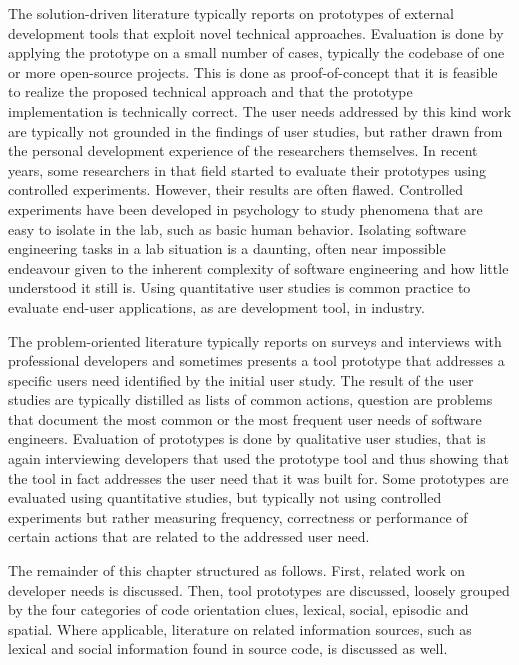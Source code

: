 The solution-driven literature typically reports on prototypes of external development tools that exploit novel technical approaches. Evaluation is done by applying the prototype on a small number of cases, typically the codebase of one or more open-source projects. This is done as proof-of-concept that it is feasible to realize the proposed technical approach and that the prototype implementation is technically correct. The user needs addressed by this kind work are typically not grounded in the findings of user studies, but rather drawn from the personal development experience of the researchers themselves. In recent years, some researchers in that field started to evaluate their prototypes using controlled experiments. However, their results are often flawed. Controlled experiments have been developed in psychology to study phenomena that are easy to isolate in the lab, such as basic human behavior. Isolating software engineering tasks in a lab situation is a daunting, often near impossible endeavour given to the inherent complexity of software engineering and how little understood it still is. Using quantitative user studies is common practice to evaluate end-user applications, as are development tool, in industry.

The problem-oriented literature typically reports on surveys and interviews with professional developers and sometimes presents a tool prototype that addresses a specific users need identified by the initial user study. The result of the user studies are typically distilled as lists of common actions, question are problems that document the most common or the most frequent user needs of software engineers. Evaluation of prototypes is done by qualitative user studies, that is again interviewing developers that used the prototype tool and thus showing that the tool in fact addresses the user need that it was built for. Some prototypes are evaluated using quantitative studies, but typically not using controlled experiments but rather measuring frequency, correctness or performance of certain actions that are related to the addressed user need.

\asteriskasteriskasterisk

The remainder of this chapter structured as follows. First, related work on developer needs is discussed. Then, tool prototypes are discussed, loosely grouped by the four categories of code orientation clues, \ie lexical, social, episodic and spatial. Where applicable, literature on related information sources, such as \eg lexical and social information found in source code, is discussed as well.

